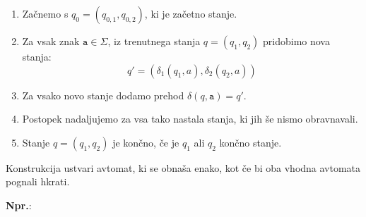 \documentclass{article}
\newcommand{\Ex}{\textbf{Npr.}:\ }
\newcommand{\Alphabet}{\Sigma}
\newcommand{\Char}[1]{\texttt{#1}}
\begin{document}
\begin{enumerate}
  \item Začnemo s $q_0 = (q_{0,1}, q_{0,2})$, ki je začetno stanje.
  \item Za vsak znak $\Char{a} \in \Alphabet$, iz trenutnega stanja $q = (q_1, q_2)$ pridobimo nova stanja:
    \begin{equation*}
      q' = (\delta_1(q_1, a), \delta_2(q_2, a))
    \end{equation*}
  \item Za vsako novo stanje dodamo prehod $\delta(q, \Char{a}) = q'$.
  \item Postopek nadaljujemo za vsa tako nastala stanja, ki jih še nismo obravnavali.
  \item Stanje $q = (q_1, q_2)$ je končno, če je $q_1$ ali $q_2$ končno stanje.
\end{enumerate}

Konstrukcija ustvari avtomat, ki se obnaša enako, kot če bi oba vhodna avtomata pognali hkrati.

\Ex
\end{document}
